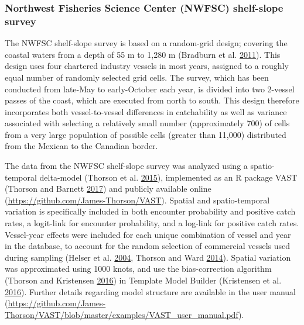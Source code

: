 \documentclass[12pt,]{article}
\begin{document}
\subsubsection{Northwest Fisheries Science Center (NWFSC) shelf-slope
survey}\label{northwest-fisheries-science-center-nwfsc-shelf-slope-survey}

The NWFSC shelf-slope survey is based on a random-grid design; covering
the coastal waters from a depth of 55 m to 1,280 m (Bradburn et al.
\protect\hyperlink{ref-bradburn_2003_2011}{2011}). This design uses four
chartered industry vessels in most years, assigned to a roughly equal
number of randomly selected grid cells. The survey, which has been
conducted from late-May to early-October each year, is divided into two
2-vessel passes of the coast, which are executed from north to south.
This design therefore incorporates both vessel-to-vessel differences in
catchability as well as variance associated with selecting a relatively
small number (approximately 700) of cells from a very large population
of possible cells (greater than 11,000) distributed from the Mexican to
the Canadian border.

The data from the NWFSC shelf-slope survey was analyzed using a
spatio-temporal delta-model (Thorson et al.
\protect\hyperlink{ref-thorson_geostatistical_2015}{2015}), implemented
as an R package VAST (Thorson and Barnett
\protect\hyperlink{ref-thorson_comparing_2017}{2017}) and publicly
available online (\url{https://github.com/James-Thorson/VAST}). Spatial
and spatio-temporal variation is specifically included in both encounter
probability and positive catch rates, a logit-link for encounter
probability, and a log-link for positive catch rates. Vessel-year
effects were included for each unique combination of vessel and year in
the database, to account for the random selection of commercial vessels
used during sampling (Helser et al.
\protect\hyperlink{ref-helser_generalized_2004}{2004}, Thorson and Ward
\protect\hyperlink{ref-thorson_accounting_2014}{2014}). Spatial
variation was approximated using 1000 knots, and use the bias-correction
algorithm (Thorson and Kristensen
\protect\hyperlink{ref-thorson_implementing_2016}{2016}) in Template
Model Builder (Kristensen et al.
\protect\hyperlink{ref-kristensen_tmb:_2016}{2016}). Further details
regarding model structure are available in the user manual
(\url{https://github.com/James-Thorson/VAST/blob/master/examples/VAST_user_manual.pdf}).
\end{document}
